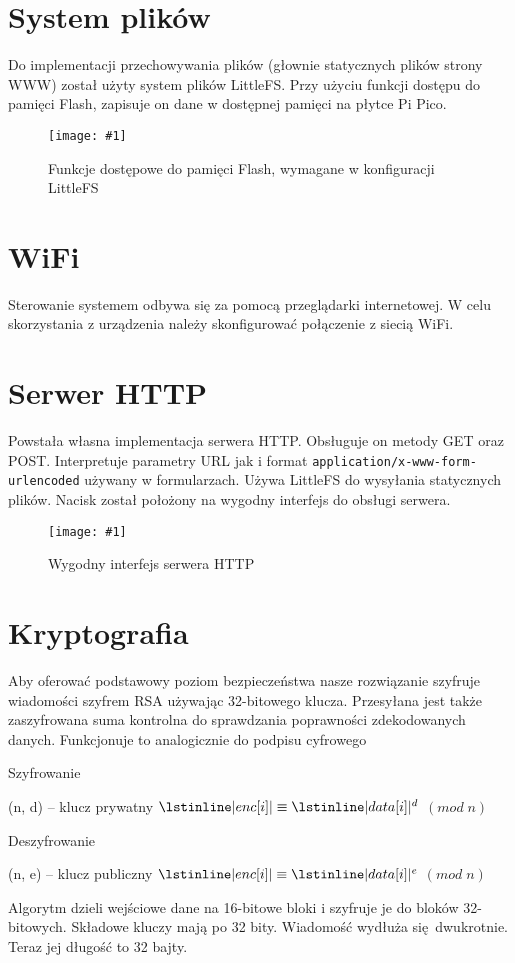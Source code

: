 \documentclass[12pt]{article}
\newcommand{\imgcustomsize}[3]{
	\begin{figure}[H]
		\centering
		\texttt{[image: \#1]}
		\caption{#2}
	\end{figure}
}
\newcommand{\img}[2]{\imgcustomsize{#1}{#2}{0.8}}
\begin{document}
	 \section{System plików}
	 	Do implementacji przechowywania plików (głownie statycznych plików strony WWW) został użyty system plików LittleFS. Przy użyciu funkcji dostępu do pamięci Flash, zapisuje on dane w dostępnej pamięci na płytce Pi Pico.
	 	\img{pgm/littlefs}{Funkcje dostępowe do pamięci Flash, wymagane w konfiguracji LittleFS}

	 \section{WiFi}
        Sterowanie systemem odbywa się za pomocą przeglądarki internetowej. W celu skorzystania z urządzenia należy skonfigurować połączenie z siecią WiFi.


	 \section{Serwer HTTP}
	 	Powstała własna implementacja serwera HTTP. Obsługuje on metody GET oraz POST. Interpretuje parametry URL jak i format \lstinline|application/x-www-form-urlencoded| używany w formularzach. Używa LittleFS do wysyłania statycznych plików. Nacisk został położony na wygodny interfejs do obsługi serwera.
	 	\img{pgm/http_init}{Wygodny interfejs serwera HTTP}
	 	
	 \section{Kryptografia}
	 	Aby oferować podstawowy poziom bezpieczeństwa nasze rozwiązanie szyfruje wiadomości szyfrem RSA używając 32-bitowego klucza. Przesyłana jest także zaszyfrowana suma kontrolna do sprawdzania poprawności zdekodowanych danych. Funkcjonuje to analogicznie do podpisu cyfrowego

		\begin{algorithm}[H]
			\caption{Szyfrowanie}
			\begin{algorithmic}[1]
				\State (n, d) -- klucz prywatny
				\State $\lstinline|enc[i]| \equiv \lstinline|data[i]|^d$ $(mod \; n)$
				\EndFor
				\EndFunction
			\end{algorithmic}
		\end{algorithm}
		
		\begin{algorithm}[H]
			\caption{Deszyfrowanie}
			\begin{algorithmic}[1]
				\State (n, e) -- klucz publiczny
				\State $\lstinline|enc[i]| \equiv \lstinline|data[i]|^e$ $(mod \; n)$
				\EndFor
				\EndFunction
			\end{algorithmic}
		\end{algorithm}
		
	 	Algorytm dzieli wejściowe dane na 16-bitowe bloki i szyfruje je do bloków 32-bitowych. Składowe kluczy mają po 32 bity. Wiadomość wydłuża się dwukrotnie. Teraz jej długość to 32 bajty.
	 	

	 
\end{document}

